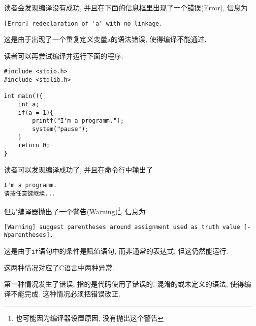         读者会发现编译没有成功, 并且在下面的信息框里出现了一个错误(Error), 信息为
\begin{lstlisting}
[Error] redeclaration of 'a' with no linkage.
\end{lstlisting}

        这是由于出现了一个重复定义变量a的语法错误, 使得编译不能通过.

        读者可以再尝试编译并运行下面的程序:
\begin{lstlisting}
#include <stdio.h>
#include <stdlib.h>

int main(){
    int a;
    if(a = 1){
        printf("I'm a programm.");
        system("pause");
    }
    return 0;
}
\end{lstlisting}

        读者可以发现编译成功了, 并且在命令行中输出了
\begin{lstlisting}
I'm a programm.
请按任意键继续...
\end{lstlisting}

        但是编译器抛出了一个警告(Warning)\footnote{也可能因为编译器设置原因, 没有抛出这个警告}, 信息为
\begin{lstlisting}
[Warning] suggest parentheses around assignment used as truth value [-Wparentheses].
\end{lstlisting}

        这是由于\texttt{if}语句中的条件是赋值语句, 而非通常的表达式. 但这仍然能运行.

        这两种情况对应了C语言中两种异常. 
        
        第一种情况发生了错误, 指的是代码使用了错误的, 混淆的或未定义的语法, 使得编译不能完成. 这种情况必须把错误改正.

